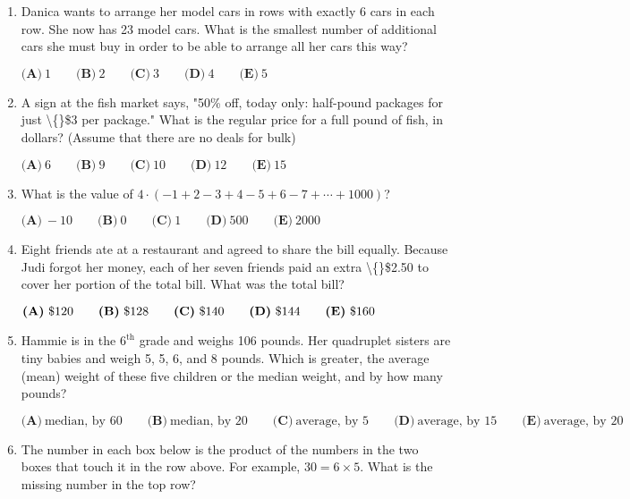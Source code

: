 \documentclass{article}
\begin{document}
\begin{enumerate}[label=\arabic*., itemsep=0.5em]
\item Danica wants to arrange her model cars in rows with exactly 6 cars in each row. She now has 23 model cars. What is the smallest number of additional cars she must buy in order to be able to arrange all her cars this way?

\(\textbf{(A)}\ 1 \qquad \textbf{(B)}\ 2 \qquad \textbf{(C)}\ 3 \qquad \textbf{(D)}\ 4 \qquad \textbf{(E)}\ 5\)\par \vspace{0.5em}\item A sign at the fish market says, "50\% off, today only: half-pound packages for just \textbackslash\{\}\$3 per package." What is the regular price for a full pound of fish, in dollars? (Assume that there are no deals for bulk)

\(\textbf{(A)}\ 6 \qquad \textbf{(B)}\ 9 \qquad \textbf{(C)}\ 10 \qquad \textbf{(D)}\ 12 \qquad \textbf{(E)}\ 15\)\par \vspace{0.5em}\item What is the value of \(4 \cdot (-1+2-3+4-5+6-7+\cdots+1000)\)?

\(\textbf{(A)}\ -10 \qquad \textbf{(B)}\ 0 \qquad \textbf{(C)}\ 1 \qquad \textbf{(D)}\ 500 \qquad \textbf{(E)}\ 2000\)\par \vspace{0.5em}\item Eight friends ate at a restaurant and agreed to share the bill equally. Because Judi forgot her money, each of her seven friends paid an extra \textbackslash\{\}\$2.50 to cover her portion of the total bill. What was the total bill?

\( \textbf{(A)}\ \text{\textdollar}120\qquad\textbf{(B)}\ \text{\textdollar}128\qquad\textbf{(C)}\ \text{\textdollar}140\qquad\textbf{(D)}\ \text{\textdollar}144\qquad\textbf{(E)}\ \text{\textdollar}160 \)\par \vspace{0.5em}\item Hammie is in the \(6^\text{th}\) grade and weighs 106 pounds. Her quadruplet sisters are tiny babies and weigh 5, 5, 6, and 8 pounds. Which is greater, the average (mean) weight of these five children or the median weight, and by how many pounds?

\(\textbf{(A)}\ \text{median, by 60} \qquad \textbf{(B)}\ \text{median, by 20} \qquad \textbf{(C)}\ \text{average, by 5} \qquad \textbf{(D)}\ \text{average, by 15} \qquad \textbf{(E)}\ \text{average, by 20}\)\par \vspace{0.5em}\item The number in each box below is the product of the numbers in the two boxes that touch it in the row above. For example, \(30 = 6\times5\). What is the missing number in the top row?



\end{enumerate}
\end{document}
